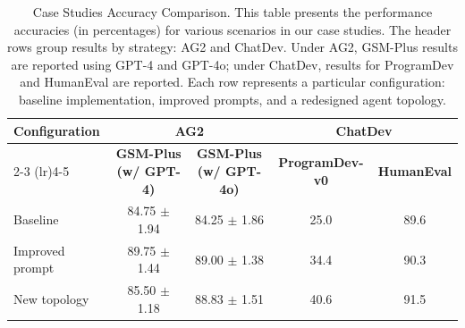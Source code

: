 

\begin{table}[ht!]
    \small
    \renewcommand{\arraystretch}{1.3} %
    \setlength{\tabcolsep}{4pt}    %
    \centering
    \caption{Case Studies Accuracy Comparison. 
    This table presents the performance accuracies (in percentages) for various scenarios in our case studies. 
    The header rows group results by strategy: AG2 and ChatDev. 
    Under AG2, GSM-Plus results are reported using GPT-4 and GPT-4o; 
    under ChatDev, results for ProgramDev and HumanEval are reported. 
    Each row represents a particular configuration: baseline implementation, improved prompts, and a redesigned agent topology.}
    \label{tab:ag2-chatdev-accuracies}
    \begin{tabular}{p{2.5cm} c c c c}
        \toprule
        \textbf{Configuration} & \multicolumn{2}{c}{\textbf{AG2}} & \multicolumn{2}{c}{\textbf{ChatDev}} \\
        \cmidrule(lr){2-3} \cmidrule(lr){4-5}
         & \textbf{GSM-Plus (w/ GPT-4)} & \textbf{GSM-Plus (w/ GPT-4o)} & \textbf{ProgramDev-v0} & \textbf{HumanEval} \\
        \midrule
        Baseline           & 84.75 $\pm$ 1.94 & 84.25 $\pm$ 1.86 & 25.0 & 89.6 \\
        \hline
        Improved prompt    & 89.75 $\pm$ 1.44 & 89.00 $\pm$ 1.38 & 34.4 & 90.3 \\
        \hline
        New topology       & 85.50 $\pm$ 1.18 & 88.83 $\pm$ 1.51 & 40.6 & 91.5 \\
        \hline
    \end{tabular}
\end{table}


